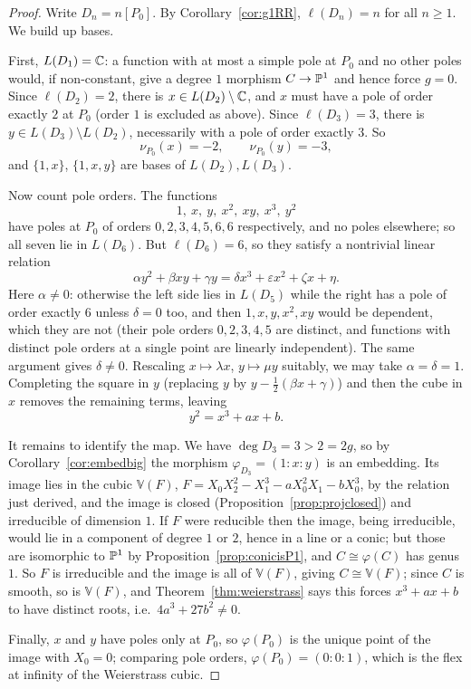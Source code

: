 \documentclass[a4paper]{scrartcl}
\newcommand{\V}{\mathbb{V}}
\begin{document}
\begin{proof}
	Write $D_n = n[P_0]$. By Corollary~\ref{cor:g1RR}, $\ell(D_n) = n$ for all $n \geq 1$. We build up bases.

	First, $L(D_1) = \mathbb{C}$: a function with at most a simple pole at $P_0$ and no other poles would, if non-constant, give a degree $1$ morphism $C \to \mathbb{P}^1$ and hence force $g = 0$. Since $\ell(D_2) = 2$, there is $x \in L(D_2)\setminus\mathbb{C}$, and $x$ must have a pole of order exactly $2$ at $P_0$ (order $1$ is excluded as above). Since $\ell(D_3) = 3$, there is $y \in L(D_3)\setminus L(D_2)$, necessarily with a pole of order exactly $3$. So
	$$\nu_{P_0}(x) = -2, \qquad \nu_{P_0}(y) = -3,$$
	and $\{1,x\}$, $\{1,x,y\}$ are bases of $L(D_2), L(D_3)$.

	Now count pole orders. The functions
	$$1,\ x,\ y,\ x^2,\ xy,\ x^3,\ y^2$$
	have poles at $P_0$ of orders $0,2,3,4,5,6,6$ respectively, and no poles elsewhere; so all seven lie in $L(D_6)$. But $\ell(D_6) = 6$, so they satisfy a nontrivial linear relation
	$$\alpha y^2 + \beta xy + \gamma y = \delta x^3 + \varepsilon x^2 + \zeta x + \eta.$$
	Here $\alpha \neq 0$: otherwise the left side lies in $L(D_5)$ while the right has a pole of order exactly $6$ unless $\delta = 0$ too, and then $1,x,y,x^2,xy$ would be dependent, which they are not (their pole orders $0,2,3,4,5$ are distinct, and functions with distinct pole orders at a single point are linearly independent). The same argument gives $\delta \neq 0$. Rescaling $x \mapsto \lambda x$, $y \mapsto \mu y$ suitably, we may take $\alpha = \delta = 1$. Completing the square in $y$ (replacing $y$ by $y - \tfrac12(\beta x + \gamma)$) and then the cube in $x$ removes the remaining terms, leaving
	$$y^2 = x^3 + ax + b.$$

	It remains to identify the map. We have $\deg D_3 = 3 > 2 = 2g$, so by Corollary~\ref{cor:embedbig} the morphism $\varphi_{D_3} = (1:x:y)$ is an embedding. Its image lies in the cubic $\V(F)$, $F = X_0X_2^2 - X_1^3 - aX_0^2X_1 - bX_0^3$, by the relation just derived, and the image is closed (Proposition~\ref{prop:projclosed}) and irreducible of dimension $1$. If $F$ were reducible then the image, being irreducible, would lie in a component of degree $1$ or $2$, hence in a line or a conic; but those are isomorphic to $\mathbb{P}^1$ by Proposition~\ref{prop:conicisP1}, and $C \cong \varphi(C)$ has genus $1$. So $F$ is irreducible and the image is all of $\V(F)$, giving $C \cong \V(F)$; since $C$ is smooth, so is $\V(F)$, and Theorem~\ref{thm:weierstrass} says this forces $x^3+ax+b$ to have distinct roots, i.e.\ $4a^3+27b^2 \neq 0$.

	Finally, $x$ and $y$ have poles only at $P_0$, so $\varphi(P_0)$ is the unique point of the image with $X_0 = 0$; comparing pole orders, $\varphi(P_0) = (0:0:1)$, which is the flex at infinity of the Weierstrass cubic.
\end{proof}
\end{document}
